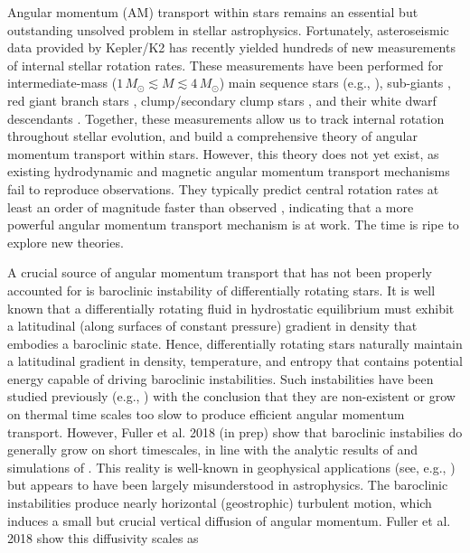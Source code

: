 Angular momentum (AM) transport within stars remains an essential but outstanding unsolved problem in stellar astrophysics. Fortunately, asteroseismic data provided by Kepler/K2 has recently yielded hundreds of new measurements of internal stellar rotation rates. These measurements have been performed for intermediate-mass ($1 \, M_\odot \! \lesssim \! M \! \lesssim \! 4 \, M_\odot$) main sequence stars (e.g., \citealt{benomar:15,vanreeth:16}), sub-giants \citep{deheuvels:14}, red giant branch stars \citep{beck:12,mosser:12}, clump/secondary clump stars \citep{mosser:12,deheuvels:15}, and their white dwarf descendants \citep{hermes:17}. Together, these measurements allow us to track internal rotation throughout stellar evolution, and build a comprehensive theory of angular momentum transport within stars. However, this theory does not yet exist, as existing hydrodynamic and magnetic angular momentum transport mechanisms fail to reproduce observations. They typically predict central rotation rates at least an order of magnitude faster than observed \citep{cantiello:14,fullerwave:14}, indicating that a more powerful angular momentum transport mechanism is at work. The time is ripe to explore new theories.

A crucial source of angular momentum transport that has not been properly accounted for is baroclinic instability of differentially rotating stars. It is well known that a differentially rotating fluid in hydrostatic equilibrium must exhibit a latitudinal (along surfaces of constant pressure) gradient in density that embodies a baroclinic state. Hence, differentially rotating stars naturally maintain a latitudinal gradient in density, temperature, and entropy that contains potential energy capable of driving baroclinic instabilities. Such instabilities have been studied previously (e.g., \citealt{goldreich:67,knobloch:82,knobloch:83,spruit:84,zahn:93}) with the conclusion that they are non-existent or grow on thermal time scales too slow to produce efficient angular momentum transport. However, Fuller et al. 2018 (in prep) show that baroclinic instabilies do generally grow on short timescales, in line with the analytic results of \citep{tassoul:82,fujimoto:87,fujimoto:88} and simulations of \cite{simitev:17}. This reality is well-known in geophysical applications (see, e.g., \citealt{pedlosky:92}) but appears to have been largely misunderstood in astrophysics. The baroclinic instabilities produce nearly horizontal (geostrophic) turbulent motion, which induces a small but crucial vertical diffusion of angular momentum. Fuller et al. 2018 show this diffusivity scales as

